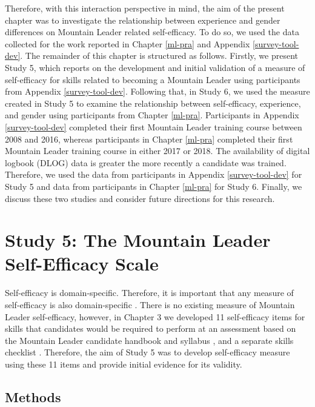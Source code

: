 \documentclass[
  12pt,
  a4paper,
]{book}
\begin{document}
Therefore, with this interaction perspective in mind, the aim of the present chapter was to investigate the relationship between experience and gender differences on Mountain Leader related self-efficacy. To do so, we used the data collected for the work reported in Chapter \ref{ml-pra} and Appendix \ref{survey-tool-dev}. The remainder of this chapter is structured as follows. Firstly, we present Study 5, which reports on the development and initial validation of a measure of self-efficacy for skills related to becoming a Mountain Leader using participants from Appendix \ref{survey-tool-dev}. Following that, in Study 6, we used the measure created in Study 5 to examine the relationship between self-efficacy, experience, and gender using participants from Chapter \ref{ml-pra}. Participants in Appendix \ref{survey-tool-dev} completed their first Mountain Leader training course between 2008 and 2016, whereas participants in Chapter \ref{ml-pra} completed their first Mountain Leader training course in either 2017 or 2018. The availability of digital logbook (DLOG) data is greater the more recently a candidate was trained. Therefore, we used the data from participants in Appendix \ref{survey-tool-dev} for Study 5 and data from participants in Chapter \ref{ml-pra} for Study 6. Finally, we discuss these two studies and consider future directions for this research.

\hypertarget{study-5}{%
\section{Study 5: The Mountain Leader Self-Efficacy Scale}\label{study-5}}

Self-efficacy is domain-specific. Therefore, it is important that any measure of self-efficacy is also domain-specific \citep{Bandura2006}. There is no existing measure of Mountain Leader self-efficacy, however, in Chapter 3 we developed 11 self-efficacy items for skills that candidates would be required to perform at an assessment based on the Mountain Leader candidate handbook and syllabus \citep{MTUK2015a}, and a separate skills checklist \citep{MTUK2015}. Therefore, the aim of Study 5 was to develop self-efficacy measure using these 11 items and provide initial evidence for its validity.

\hypertarget{study-5-methods}{%
\subsection{Methods}\label{study-5-methods}}
\end{document}
